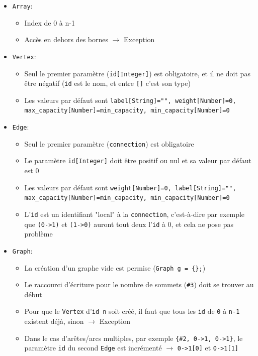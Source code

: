 \documentclass[french]{article}
\begin{document}
				\begin{itemize}
					\item \texttt{Array}: 
					\begin{itemize}
						\item Index de 0 à n-1
						\item Accès en dehors des bornes $\rightarrow$ Exception
					\end{itemize}
					\item \texttt{Vertex}:
					\begin{itemize}
						\item Seul le premier paramètre (\texttt{id[Integer]}) est obligatoire, et il ne doit pas être négatif (\texttt{id} est le nom, et entre \texttt{[]} c'est son type)
						\item Les valeurs par défaut sont \texttt{label[String]="", weight[Number]=0, max\_capacity[Number]=min\_capacity, min\_capacity[Number]=0}
					\end{itemize}
					\item \texttt{Edge}: 
					\begin{itemize}
						\item Seul le premier paramètre (\texttt{connection}) est obligatoire
						\item Le paramètre \texttt{id[Integer]} doit être positif ou nul et sa valeur par défaut est 0
						\item Les valeurs par défaut sont \texttt{weight[Number]=0, label[String]="", max\_capacity[Number]=min\_capacity, min\_capacity[Number]=0}
						\item L'\texttt{id} est un identifiant "local" à la \texttt{connection}, c'est-à-dire par exemple que \texttt{(0->1)} et \texttt{(1->0)} auront tout deux l'\texttt{id} à 0, et cela ne pose pas problème
					\end{itemize}
					\item \texttt{Graph}: 
					\begin{itemize}
						\item La création d'un graphe vide est permise (\texttt{Graph g = \{\};})
						\item Le raccourci d'écriture pour le nombre de sommets (\texttt{\#3}) doit se trouver au début
						\item Pour que le \texttt{Vertex} d'\texttt{id n} soit créé, il faut que tous les \texttt{id} de \texttt{0} à \texttt{n-1} existent déjà, sinon $\rightarrow$ Exception 
						\item Dans le cas d'arêtes/arcs multiples, par exemple \texttt{\{\#2, 0->1, 0->1\}}, le paramètre \texttt{id} du second \texttt{Edge} est incrémenté $\rightarrow$ \texttt{0->1[0]} et \texttt{0->1[1]}

\end{itemize}
\end{itemize}
\end{document}
